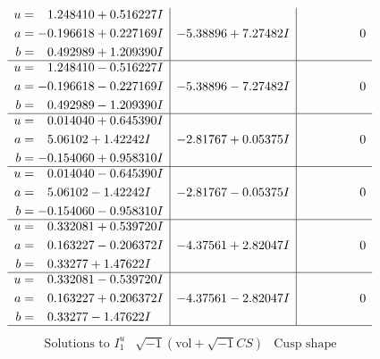 \documentclass[1p]{elsarticle_modified}
\theoremstyle{definition}
\newcommand{\I}{\sqrt{-1}}
\begin{document}
$$\begin{array}{c|c|c}
\begin{aligned}
u &= \phantom{-}1.248410 + 0.516227 I \\
a &= -0.196618 + 0.227169 I \\
b &= \phantom{-}0.492989 + 1.209390 I\end{aligned}
 & -5.38896 + 7.27482 I & \phantom{-0.000000 } 0 \\ \hline\begin{aligned}
u &= \phantom{-}1.248410 - 0.516227 I \\
a &= -0.196618 - 0.227169 I \\
b &= \phantom{-}0.492989 - 1.209390 I\end{aligned}
 & -5.38896 - 7.27482 I & \phantom{-0.000000 } 0 \\ \hline\begin{aligned}
u &= \phantom{-}0.014040 + 0.645390 I \\
a &= \phantom{-}5.06102 + 1.42242 I \\
b &= -0.154060 + 0.958310 I\end{aligned}
 & -2.81767 + 0.05375 I & \phantom{-0.000000 } 0 \\ \hline\begin{aligned}
u &= \phantom{-}0.014040 - 0.645390 I \\
a &= \phantom{-}5.06102 - 1.42242 I \\
b &= -0.154060 - 0.958310 I\end{aligned}
 & -2.81767 - 0.05375 I & \phantom{-0.000000 } 0 \\ \hline\begin{aligned}
u &= \phantom{-}0.332081 + 0.539720 I \\
a &= \phantom{-}0.163227 - 0.206372 I \\
b &= \phantom{-}0.33277 + 1.47622 I\end{aligned}
 & -4.37561 + 2.82047 I & \phantom{-0.000000 } 0 \\ \hline\begin{aligned}
u &= \phantom{-}0.332081 - 0.539720 I \\
a &= \phantom{-}0.163227 + 0.206372 I \\
b &= \phantom{-}0.33277 - 1.47622 I\end{aligned}
 & -4.37561 - 2.82047 I & \phantom{-0.000000 } 0\\
 \hline 
 \end{array}$$\newpage$$\begin{array}{c|c|c}  
\text{Solutions to }I^u_{1}& \I (\text{vol} + \sqrt{-1}CS) & \text{Cusp shape}\\
 \hline 
\begin{aligned}

\end{aligned}
\end{array}$$
\end{document}
